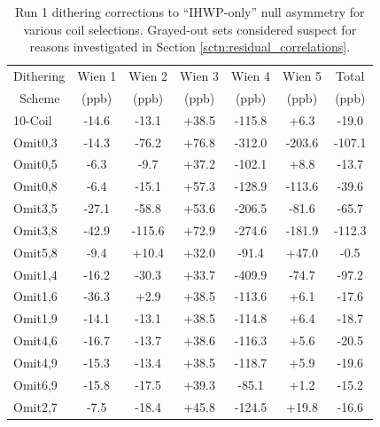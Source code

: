 \begin{table}[!h]
\caption{Run 1 dithering corrections to ``IHWP-only'' null asymmetry for various coil selections. Grayed-out sets considered suspect  for reasons investigated in Section \ref{sctn:residual_correlations}.}
\begin{center}
\begin{tabular}[h]{|l||c|c|c|c|c||c|}\hline
Dithering& Wien 1& Wien 2& Wien 3& Wien 4& Wien 5& Total\\
~Scheme&(ppb)&(ppb)&(ppb)&(ppb)&(ppb)&(ppb)\\\hline\hline
10-Coil& -14.6& -13.1& +38.5& -115.8& +6.3& -19.0\\\hline
{\color{Gray}Omit0,3}&{\color{Gray} -14.3}&{\color{Gray} -76.2}&{\color{Gray} +76.8}&{\color{Gray} -312.0}&{\color{Gray} -203.6}&{\color{Gray} -107.1}\\\hline
Omit0,5& -6.3& -9.7& +37.2& -102.1& +8.8& -13.7\\\hline
{\color{Gray}Omit0,8}&{\color{Gray} -6.4}&{\color{Gray} -15.1}&{\color{Gray} +57.3}&{\color{Gray} -128.9}&{\color{Gray} -113.6}&{\color{Gray} -39.6}\\\hline
{\color{Gray}Omit3,5}&{\color{Gray} -27.1}&{\color{Gray} -58.8}&{\color{Gray} +53.6}&{\color{Gray} -206.5}&{\color{Gray} -81.6}&{\color{Gray} -65.7}\\\hline
{\color{Gray}Omit3,8}&{\color{Gray} -42.9}&{\color{Gray} -115.6}&{\color{Gray} +72.9}&{\color{Gray} -274.6}&{\color{Gray} -181.9}&{\color{Gray} -112.3}\\\hline
{\color{Gray}Omit5,8}&{\color{Gray} -9.4}&{\color{Gray} +10.4}&{\color{Gray} +32.0}&{\color{Gray} -91.4}&{\color{Gray} +47.0}&{\color{Gray} -0.5}\\\hline
{\color{Gray}Omit1,4}&{\color{Gray} -16.2}&{\color{Gray} -30.3}&{\color{Gray} +33.7}&{\color{Gray} -409.9}&{\color{Gray} -74.7}&{\color{Gray} -97.2}\\\hline
Omit1,6& -36.3& +2.9& +38.5& -113.6& +6.1& -17.6\\\hline
Omit1,9& -14.1& -13.1& +38.5& -114.8& +6.4& -18.7\\\hline
Omit4,6& -16.7& -13.7& +38.6& -116.3& +5.6& -20.5\\\hline
Omit4,9& -15.3& -13.4& +38.5& -118.7& +5.9& -19.6\\\hline
Omit6,9& -15.8& -17.5& +39.3& -85.1& +1.2& -15.2\\\hline
Omit2,7& -7.5& -18.4& +45.8& -124.5& +19.8& -16.6\\\hline

\end{tabular}
\end{center}
\end{table}

